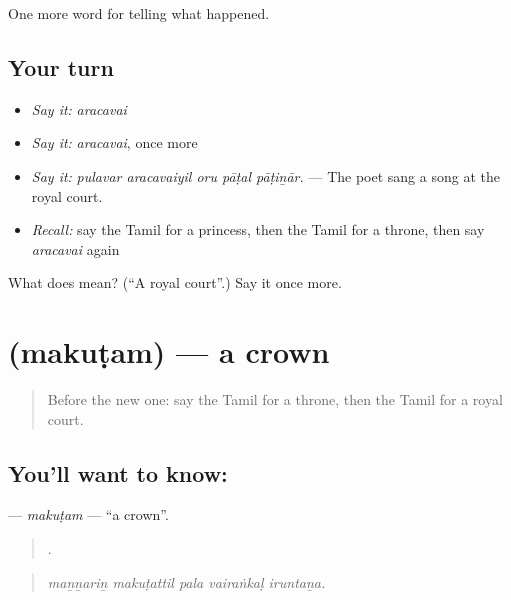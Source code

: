 \begin{grammarlens}[title={What you've built}]
One more word for telling what happened.
\end{grammarlens}

\subsection*{Your turn}
\begin{itemize}
\raggedright
  \item \emph{Say it:} \emph{aracavai}
  \item \emph{Say it:} \emph{aracavai}, once more
  \item \emph{Say it:} \emph{pulavar aracavaiyil oru pāṭal pāṭiṉār.} — The poet sang a song at the royal court.
  \item \emph{Recall:} say the Tamil for a princess, then the Tamil for a throne, then say \emph{aracavai} again
\end{itemize}

\begin{tcolorbox}[breakable,colback=teal!4,colframe=teal!35!black,title={Before you move on}]
What does  mean? (\textquotedblleft{}A royal court\textquotedblright{}.) Say it once more.
\end{tcolorbox}
\section[\texorpdfstring{\ta{மகுடம்} (makuṭam)}{மகுடம் (makuṭam)}]{ (makuṭam) — a crown}

\label{lesson:TA-C329-makutam}



\begin{quote}
Before the new one: say the Tamil for a throne, then the Tamil for a royal court.
\end{quote}

\subsection*{You'll want to know: }
\textbf{} — \emph{makuṭam} — \textquotedblleft{}a crown\textquotedblright{}.

\begin{quote}
    .
\end{quote}

\begin{quote}
\emph{maṉṉariṉ makuṭattil pala vairaṅkaḷ iruntaṉa.}
\end{quote}

